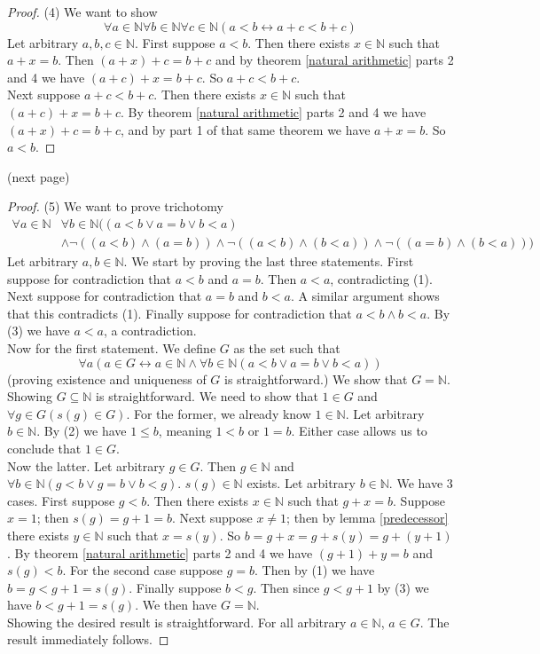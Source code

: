 \documentclass{report}
\begin{document}
\begin{proof}(4)
We want to show
\begin{equation*}
\forall a\in\mathbb N\forall b\in\mathbb N\forall c\in\mathbb N(a<b\leftrightarrow a+c<b+c)
\end{equation*}
Let arbitrary $a,b,c\in\mathbb N$. First suppose $a<b$. Then there exists $x\in\mathbb N$ such that $a+x=b$. Then $(a+x)+c=b+c$ and by theorem \ref{natural arithmetic} parts 2 and 4 we have 
$(a+c)+x=b+c$. So $a+c<b+c$.\\
\indent Next suppose $a+c<b+c$. Then there exists $x\in\mathbb N$ such that $(a+c)+x=b+c$.
By theorem \ref{natural arithmetic} parts 2 and 4 we have $(a+x)+c=b+c$, and by part 1 of that same theorem we have $a+x=b$. So $a<b$.
\end{proof}
\noindent(next page)\newpage
\begin{proof}(5)
We want to prove trichotomy
\begin{align*}
\forall a\in\mathbb N&\forall b\in\mathbb N((a<b\lor a=b\lor b<a)\\
&\land\neg((a<b)\land(a=b))\land\neg((a<b)\land(b<a))\land\neg((a=b)\land(b<a)))
\end{align*}
Let arbitrary $a,b\in\mathbb N$. We start by proving the last three statements. First suppose for contradiction that $a<b$ and $a=b$. Then $a<a$, contradicting (1).
Next suppose for contradiction that $a=b$ and $b<a$. A similar argument shows that this contradicts (1).
Finally suppose for contradiction that $a<b\land b<a$. By (3) we have $a<a$, a contradiction.\\
\indent Now for the first statement. We define $G$ as the set such that
\begin{equation*}
\forall a(a\in G\leftrightarrow a\in\mathbb N\land\forall b\in\mathbb N(a<b\lor a=b\lor b<a))
\end{equation*}
(proving existence and uniqueness of $G$ is straightforward.)
We show that $G=\mathbb N$. Showing $G\subseteq\mathbb N$ is straightforward. We need to show that $1\in G$ and $\forall g\in G(s(g)\in G)$. For the former, we already know $1\in\mathbb N$. Let
arbitrary $b\in\mathbb N$. By (2) we have $1\leq b$, meaning $1<b$ or $1=b$. Either case allows us to conclude that $1\in G$.\\
\indent Now the latter. Let arbitrary $g\in G$. Then $g\in\mathbb N$ and 
$\forall b\in\mathbb N(g<b\lor g=b\lor b<g)$. $s(g)\in\mathbb N$ exists. Let arbitrary $b\in\mathbb N$. We have 3 cases. First suppose $g<b$. Then there exists $x\in\mathbb N$ 
such that $g+x=b$. Suppose $x=1$; then $s(g)=g+1=b$. Next suppose $x\neq1$; then by lemma \ref{predecessor} there exists $y\in\mathbb N$ such that $x=s(y)$. So 
$b=g+x=g+s(y)=g+(y+1)$. By theorem \ref{natural arithmetic} parts 2 and 4 we have $(g+1)+y=b$ and $s(g)<b$. For the second case suppose $g=b$. Then by (1) we have $b=g<g+1=s(g)$. 
Finally suppose $b<g$. Then since $g<g+1$ by (3) we have $b<g+1=s(g)$. We then have $G=\mathbb N$.\\
\indent Showing the desired result is straightforward. For all arbitrary $a\in\mathbb N$, $a\in G$. The result immediately follows.
\end{proof}
\end{document}
